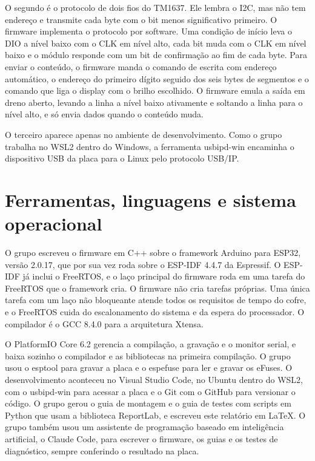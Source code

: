 \documentclass[11pt,a4paper]{article}
\begin{document}
O segundo é o protocolo de dois fios do TM1637. Ele lembra o I2C, mas não tem endereço e transmite cada byte com o bit menos significativo primeiro. O firmware implementa o protocolo por software. Uma condição de início leva o DIO a nível baixo com o CLK em nível alto, cada bit muda com o CLK em nível baixo e o módulo responde com um bit de confirmação ao fim de cada byte. Para enviar o conteúdo, o firmware manda o comando de escrita com endereço automático, o endereço do primeiro dígito seguido dos seis bytes de segmentos e o comando que liga o display com o brilho escolhido. O firmware emula a saída em dreno aberto, levando a linha a nível baixo ativamente e soltando a linha para o nível alto, e só envia dados quando o conteúdo muda.

O terceiro aparece apenas no ambiente de desenvolvimento. Como o grupo trabalha no WSL2 dentro do Windows, a ferramenta usbipd-win encaminha o dispositivo USB da placa para o Linux pelo protocolo USB/IP.

\section{Ferramentas, linguagens e sistema operacional}

O grupo escreveu o firmware em C++ sobre o framework Arduino para ESP32, versão 2.0.17, que por sua vez roda sobre o ESP-IDF 4.4.7 da Espressif. O ESP-IDF já inclui o FreeRTOS, e o laço principal do firmware roda em uma tarefa do FreeRTOS que o framework cria. O firmware não cria tarefas próprias. Uma única tarefa com um laço não bloqueante atende todos os requisitos de tempo do cofre, e o FreeRTOS cuida do escalonamento do sistema e da espera do processador. O compilador é o GCC 8.4.0 para a arquitetura Xtensa.

O PlatformIO Core 6.2 gerencia a compilação, a gravação e o monitor serial, e baixa sozinho o compilador e as bibliotecas na primeira compilação. O grupo usou o esptool para gravar a placa e o espefuse para ler e gravar os eFuses. O desenvolvimento aconteceu no Visual Studio Code, no Ubuntu dentro do WSL2, com o usbipd-win para acessar a placa e o Git com o GitHub para versionar o código. O grupo gerou o guia de montagem e o guia de testes com scripts em Python que usam a biblioteca ReportLab, e escreveu este relatório em \LaTeX. O grupo também usou um assistente de programação baseado em inteligência artificial, o Claude Code, para escrever o firmware, os guias e os testes de diagnóstico, sempre conferindo o resultado na placa.
\end{document}
